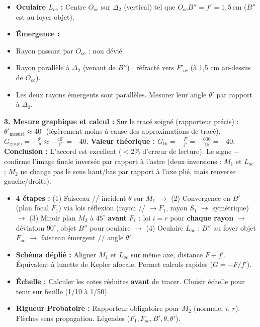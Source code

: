 \documentclass[11pt]{article}
\begin{document}
\begin{exoresolu}
\begin{itemize}
    \item \textbf{Oculaire $L_{oc}$ :} Centre $O_{oc}$ sur $\Delta_2$ (vertical) tel que $O_{oc}B'' = f' = 1,5\,\text{cm}$ ($B''$ est au foyer objet).
    \item \textbf{Émergence :}
        \item Rayon passant par $O_{oc}$ : non dévié.
        \item Rayon parallèle à $\Delta_2$ (venant de $B''$) : réfracté vers $F'_{oc}$ (à 1,5 cm au-dessus de $O_{oc}$).
        \item Les deux rayons émergents sont parallèles. Mesurer leur angle $\theta'$ par rapport à $\Delta_2$.
\end{itemize}

\textbf{3. Mesure graphique et calcul :}
Sur le tracé soigné (rapporteur précis) :
$\theta'_{\text{mesuré}} \approx 40^\circ$ (légèrement moins à cause des approximations de tracé).
$G_{\text{graph}} = -\frac{\theta'}{\theta} \approx -\frac{40^\circ}{1^\circ} = -40$.
\textbf{Valeur théorique :} $G_{\text{th}} = -\frac{F}{f'} = -\frac{600}{15} = -40$.
\textbf{Conclusion :} L'accord est excellent ($< 2\%$ d'erreur de lecture). Le signe $-$ confirme l'image finale inversée par rapport à l'astre (deux inversions : $M_1$ et $L_{oc}$ ; $M_2$ ne change pas le sens haut/bas par rapport à l'axe plié, mais renverse gauche/droite).
\end{exoresolu}

\begin{aretenir}
\begin{itemize}
    \item \textbf{4 étapes :} (1) Faisceau // incident $\theta$ sur $M_1$ $\to$ (2) Convergence en $B'$ (plan focal $F_1$) via lois réflexion (rayon // $\to F_1$, rayon $S_1$ $\to$ symétrique) $\to$ (3) Miroir plan $M_2$ à $45^\circ$ \textbf{avant} $F_1$ : loi $i=r$ pour \textbf{chaque rayon} $\to$ déviation $90^\circ$, objet $B''$ pour oculaire $\to$ (4) Oculaire $L_{oc}$ : $B''$ au foyer objet $F_{oc}$ $\to$ faisceau émergent // angle $\theta'$.
    \item \textbf{Schéma déplié :} Aligner $M_1$ et $L_{oc}$ sur même axe, distance $F+f'$. Équivalent à lunette de Kepler afocale. Permet calculs rapides ($G=-F/f'$).
    \item \textbf{Échelle :} Calculer les cotes réduites \textbf{avant} de tracer. Choisir échelle pour tenir sur feuille (1/10 à 1/50).
    \item \textbf{Rigueur Probatoire :} Rapporteur obligatoire pour $M_2$ (normale, $i$, $r$). Flèches sens propagation. Légendes ($F_1, F_{oc}, B', \theta, \theta'$).
\end{itemize}
\end{aretenir}
\end{document}
